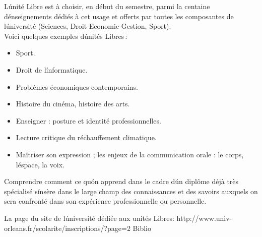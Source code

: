 \vfill

{
L\'unité Libre est à choisir, en début du semestre, parmi la centaine d\'enseignements dédiés à cet usage et offerts par toutes
les composantes de l\'université (Sciences, Droit-Economie-Gestion, Sport).\\
Voici quelques exemples d\'unités Libres\,:
\begin{itemize}
  \item Sport.
  \item Droit de l\'informatique.
  \item Problèmes économiques contemporains.
  \item Histoire du cinéma, histoire des arts.
  \item Enseigner : posture et identité professionnelles.
  \item Lecture critique du réchauffement climatique.
  \item Maîtriser son expression ; les enjeux de la communication orale : le corps, l\'espace, la voix.
\end{itemize} 
} 
{}
{\begin{itemize}
 \ObjItem Comprendre comment ce qu\'on apprend dans le cadre d\'un diplôme déjà très spécialisé s\'insère dans le large champ des connaissances
 et des savoirs auxquels on sera confronté dans son expérience professionnelle ou personnelle.
\end{itemize} 
} 
{La page du site de l\'université dédiée aux unités Libres: http://www.univ-orleans.fr/scolarite/inscriptions/?page=2} 
{Biblio} 
 
\vfill


